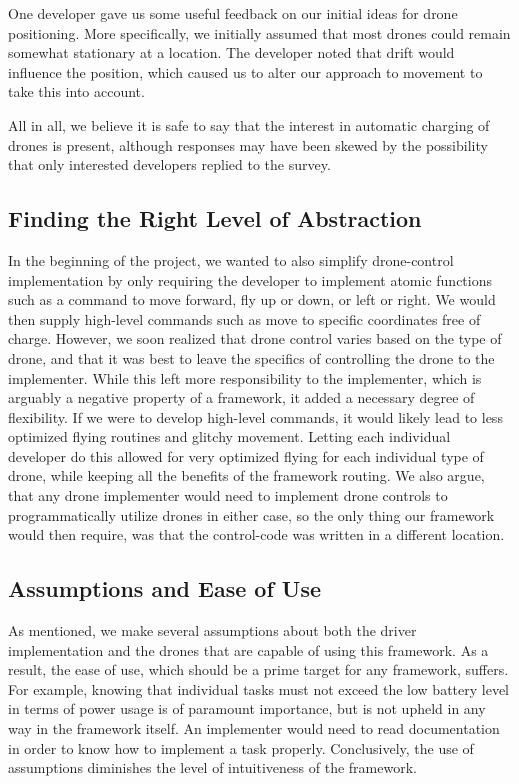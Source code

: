 One developer gave us some useful feedback on our initial ideas for drone positioning. More specifically, we initially assumed that most drones could remain somewhat stationary at a location. The developer noted that drift would influence the position, which caused us to alter our approach to movement to take this into account.

All in all, we believe it is safe to say that the interest in automatic charging of drones is present, although  responses may have been skewed by the possibility that only interested developers replied to the survey.

\subsection{Finding the Right Level of Abstraction}
In the beginning of the project, we wanted to also simplify drone-control implementation by only requiring the developer to implement atomic functions such as a command to move forward, fly up or down, or left or right. We would then supply high-level commands such as move to specific coordinates free of charge. However, we soon realized that drone control varies based on the type of drone, and that it was best to leave the specifics of controlling the drone to the implementer. While this left more responsibility to the implementer, which is arguably a negative property of a framework, it added a necessary degree of flexibility. If we were to develop high-level commands, it would likely lead to less optimized flying routines and glitchy movement. Letting each individual developer do this allowed for very optimized flying for each individual type of drone, while keeping all the benefits of the framework routing. We also argue, that any drone implementer would need to implement drone controls to programmatically utilize drones in either case, so the only thing our framework would then require, was that the control-code was written in a different location.

\subsection{Assumptions and Ease of Use}
As mentioned, we make several assumptions about both the driver implementation and the drones that are capable of using this framework. As a result, the ease of use, which should be a prime target for any framework, suffers. For example, knowing that individual tasks must not exceed the low battery level in terms of power usage is of paramount importance, but is not upheld in any way in the framework itself. An implementer would need to read documentation in order to know how to implement a task properly. Conclusively, the use of assumptions diminishes the level of intuitiveness of the framework.

